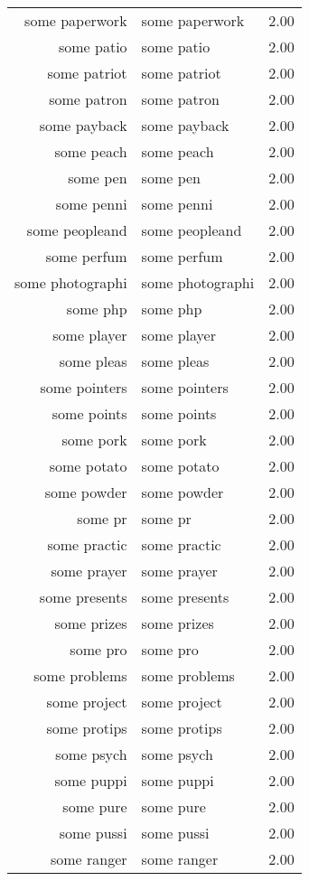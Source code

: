 \begin{table}[ht]
\begin{tabular}{rlr}
  some paperwork & some paperwork & 2.00 \\ 
  some patio & some patio & 2.00 \\ 
  some patriot & some patriot & 2.00 \\ 
  some patron & some patron & 2.00 \\ 
  some payback & some payback & 2.00 \\ 
  some peach & some peach & 2.00 \\ 
  some pen & some pen & 2.00 \\ 
  some penni & some penni & 2.00 \\ 
  some peopleand & some peopleand & 2.00 \\ 
  some perfum & some perfum & 2.00 \\ 
  some photographi & some photographi & 2.00 \\ 
  some php & some php & 2.00 \\ 
  some player & some player & 2.00 \\ 
  some pleas & some pleas & 2.00 \\ 
  some pointers & some pointers & 2.00 \\ 
  some points & some points & 2.00 \\ 
  some pork & some pork & 2.00 \\ 
  some potato & some potato & 2.00 \\ 
  some powder & some powder & 2.00 \\ 
  some pr & some pr & 2.00 \\ 
  some practic & some practic & 2.00 \\ 
  some prayer & some prayer & 2.00 \\ 
  some presents & some presents & 2.00 \\ 
  some prizes & some prizes & 2.00 \\ 
  some pro & some pro & 2.00 \\ 
  some problems & some problems & 2.00 \\ 
  some project & some project & 2.00 \\ 
  some protips & some protips & 2.00 \\ 
  some psych & some psych & 2.00 \\ 
  some puppi & some puppi & 2.00 \\ 
  some pure & some pure & 2.00 \\ 
  some pussi & some pussi & 2.00 \\ 
  some ranger & some ranger & 2.00 \\ 

\end{tabular}
\end{table}
